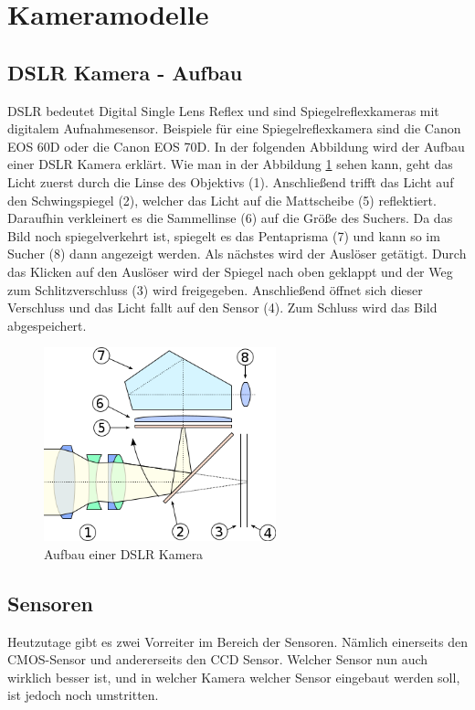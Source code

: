 \section{Kameramodelle}
\subsection{DSLR Kamera - Aufbau}
DSLR bedeutet Digital Single Lens Reflex und sind Spiegelreflexkameras mit digitalem Aufnahmesensor. Beispiele für eine Spiegelreflexkamera sind die Canon EOS 60D oder die Canon EOS 70D. In der folgenden Abbildung wird der Aufbau einer DSLR Kamera erklärt.\newline 
Wie man in der Abbildung \ref{fig:abb13} sehen kann, geht das Licht zuerst durch die Linse des Objektivs (1). Anschließend trifft das Licht auf den Schwingspiegel (2), welcher das Licht auf die Mattscheibe (5) reflektiert. Daraufhin verkleinert es die Sammellinse (6) auf die Größe des Suchers. Da das Bild noch spiegelverkehrt ist, spiegelt es das Pentaprisma (7) und kann so im Sucher (8) dann angezeigt werden. Als nächstes wird der Auslöser getätigt. Durch das Klicken auf den Auslöser wird der Spiegel nach oben geklappt und der Weg zum Schlitzverschluss (3) wird freigegeben. Anschließend öffnet sich dieser Verschluss und das Licht fallt auf den Sensor (4). Zum Schluss wird das Bild abgespeichert.\citep{aufbau}
\begin{figure}[H]
	\centering
	\includegraphics[width=0.6\textwidth]{abb13} 
	\caption[Aufbau einer DSLR Kamera]{Aufbau einer DSLR Kamera\footnotemark}\label{fig:abb13}
\end{figure}
\subsection{Sensoren}
Heutzutage gibt es zwei Vorreiter im Bereich der Sensoren. Nämlich einerseits den CMOS-Sensor und andererseits den CCD Sensor. Welcher Sensor nun auch wirklich besser ist, und in welcher Kamera welcher Sensor eingebaut werden soll, ist jedoch noch umstritten.\citep{sensor}
